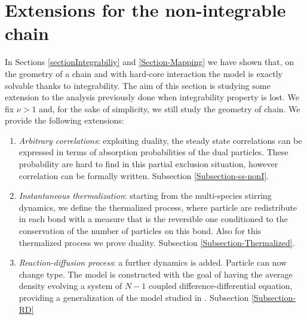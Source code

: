 \documentclass[10pt]{article}
\numberwithin{equation}{section}
\numberwithin{equation}{subsection}
\begin{document}
\section{Extensions for the non-integrable chain}
In Sections \ref{sectionIntegrabiliy} and \ref{Section-Mapping} we have shown that, on the geometry of a chain and with hard-core interaction the model is exactly solvable thanks to integrability.  
The aim of this section is studying some extension to the analysis previously done when integrability property is lost. We fix $\nu>1$ and, for the sake of simplicity, we still study the geometry of chain. We provide the following extensions: 
\begin{enumerate}
	\item \textit{Arbitrary correlations}: exploiting duality, the steady state correlations can be expressed in terms of absorption probabilities of the dual particles. These probability are hard to find in this partial exclusion situation, however correlation can be formally written. Subsection \ref{Subsection-ss-nonI}.
	\item \textit{Instantaneous thermalization}: starting from the multi-species stirring dynamics, we define the thermalized process, where particle are redistribute in each bond with a measure that is the reversible one conditioned to the conservation of the number of particles on this bond. Also for this thermalized process we prove duality. Subsection \ref{Subsection-Thermalized}.
	\item \textit{Reaction-diffusion process}: a further dynamics is added. Particle can now change type. The model is constructed with the goal of having the average density evolving a system of $N-1$ coupled difference-differential equation, providing a generalization of the model studied in \cite{casini2022uphill}. Subsection \ref{Subsection-RD}
\end{enumerate}
\end{document}

